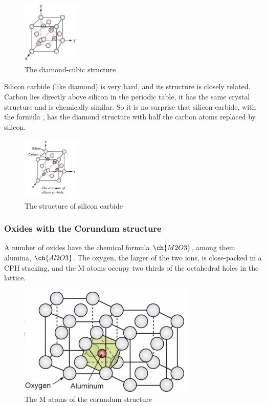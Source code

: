 \documentclass{article}
\begin{document}
\begin{figure}[h]
    \centering
    \includegraphics[width = 0.25\textwidth]{images/mat9.png}
    \caption{The diamond-cubic structure}
    \label{fig:enter-label}
\end{figure}

Silicon carbide (like diamond) is very hard, and its structure is closely related. Carbon lies directly above silicon in the periodic table, it has the same crystal structure and is chemically similar. So it is no surprise that silicon carbide, with the formula , has the diamond structure with half the carbon atoms replaced by silicon. 

\begin{figure}[h]
    \centering
    \includegraphics[width = 0.25\textwidth]{images/mat10.png}
    \caption{The structure of silicon carbide}
    \label{fig:enter-label}
\end{figure}

\subsubsection{Oxides with the Corundum structure}

A number of oxides have the chemical formula $\ch{M2O3}$, among them alumina, $\ch{Al2O3}$. The oxygen, the larger of the two ions, is close-packed in a CPH stacking, and the M atoms occupy two thirds of the octahedral holes in the lattice.

\begin{figure}[h]
    \centering
    \includegraphics{images/mat11.png}
    \caption{The M atoms of the corundum structure}
    \label{fig:enter-label}
\end{figure}
\end{document}
